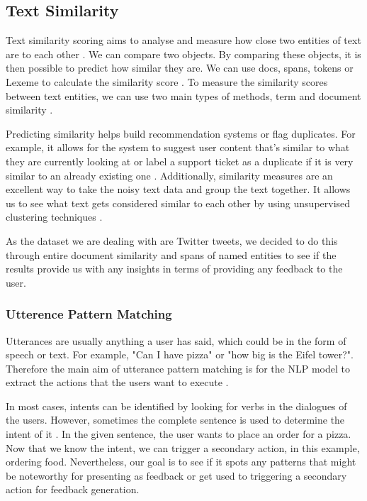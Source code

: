 	\subsection{Text Similarity} %
	Text similarity scoring aims to analyse and measure how close two entities of text are to each other \cite{sarkar2016text}. We can compare two objects. By comparing these objects, it is then possible to predict how similar they are. We can use docs, spans, tokens or Lexeme to calculate the similarity score \cite{spacy_vec_sim}. To measure the similarity scores between text entities, we can use two main types of methods, term and document similarity \cite{sarkar2016text}. 
	
	Predicting similarity helps build recommendation systems or flag duplicates. For example, it allows for the system to suggest user content that's similar to what they are currently looking at or label a support ticket as a duplicate if it is very similar to an already existing one \cite{spacy_vec_sim}. Additionally, similarity measures are an excellent way to take the noisy text data and group the text together. It allows us to see what text gets considered similar to each other by using unsupervised clustering techniques \cite{sarkar2016text}.
	
	As the dataset we are dealing with are Twitter tweets, we decided to do this through entire document similarity and spans of named entities to see if the results provide us with any insights in terms of providing any feedback to the user. 
	
	
	\subsubsection{Utterence Pattern Matching}
	Utterances are usually anything a user has said, which could be in the form of speech or text. For example, "Can I have pizza" or "how big is the Eifel tower?". Therefore the main aim of utterance pattern matching is for the NLP model to extract the actions that the users want to execute \cite{vajjala2020practical}.
	
	In most cases, intents can be identified by looking for verbs in the dialogues of the users. However, sometimes the complete sentence is used to determine the intent of it \cite{bird2009natural}. In the given sentence, the user wants to place an order for a pizza. Now that we know the intent, we can trigger a secondary action, in this example, ordering food. Nevertheless, our goal is to see if it spots any patterns that might be noteworthy for presenting as feedback or get used to triggering a secondary action for feedback generation.
	
